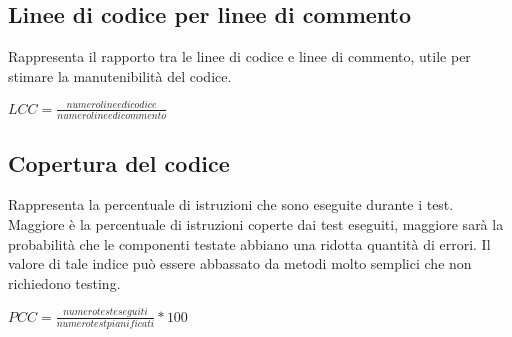   \subsection{Linee di codice per linee di commento}
  Rappresenta il rapporto tra le linee di codice e linee di commento, utile per stimare la manutenibilità del codice.
  \begin{center}
    \( LCC = \frac{numero linee di codice}{numero linee di commento} \)
  \end{center}

  \subsection{Copertura del codice}
  Rappresenta la percentuale di istruzioni che sono eseguite durante i test. Maggiore è la percentuale di istruzioni coperte dai test eseguiti, maggiore sarà la probabilità
che le componenti testate abbiano una ridotta quantità di errori. Il valore di tale indice può essere abbassato da metodi molto semplici che non richiedono testing.
  \begin{center}
    \( PCC = {\frac{numero test eseguiti}{numero test pianificati}}*100 \)
  \end{center}
